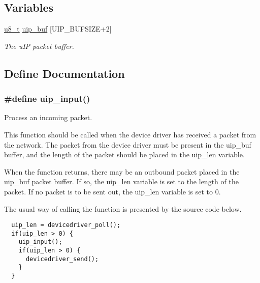 \subsection*{Variables}
\begin{CompactItemize}
\item 
\hyperlink{a00070_ge081489b4906f65a3cb18e9fbe9f8d23}{u8\_\-t} \hyperlink{a00063_gb81e78f890dbbee50c533a9734b74fd9}{uip\_\-buf} \mbox{[}UIP\_\-BUFSIZE+2\mbox{]}
\begin{CompactList}\small\item\em The u\-IP packet buffer. \item\end{CompactList}\end{CompactItemize}


\subsection{Define Documentation}
\hypertarget{a00063_ga4360412ee9350fba725f98a137169fe}{
\subsubsection[uip\_\-input]{\setlength{\rightskip}{0pt plus 5cm}\#define uip\_\-input()}}
\label{a00063_ga4360412ee9350fba725f98a137169fe}


Process an incoming packet. 

This function should be called when the device driver has received a packet from the network. The packet from the device driver must be present in the uip\_\-buf buffer, and the length of the packet should be placed in the uip\_\-len variable.

When the function returns, there may be an outbound packet placed in the uip\_\-buf packet buffer. If so, the uip\_\-len variable is set to the length of the packet. If no packet is to be sent out, the uip\_\-len variable is set to 0.

The usual way of calling the function is presented by the source code below. 

\footnotesize\begin{verbatim}  uip_len = devicedriver_poll();
  if(uip_len > 0) {
    uip_input();
    if(uip_len > 0) {
      devicedriver_send();
    }
  }
\end{verbatim}
\normalsize


